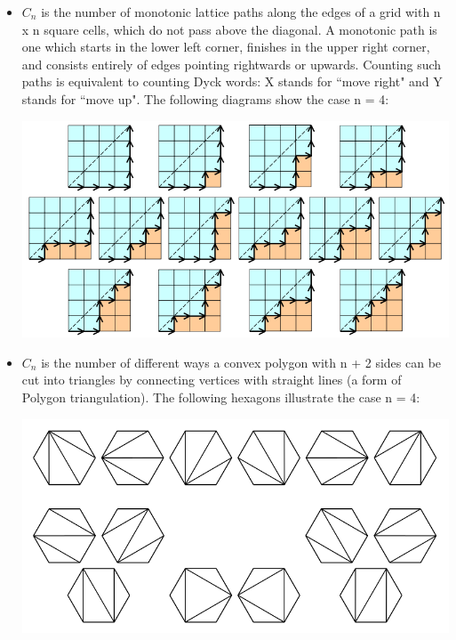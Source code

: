 \documentclass[10pt, twocolumn]{article}
\begin{document}
\begin{flushleft}
\begin{itemize}
\item $C_n$ is the number of monotonic lattice paths along the edges of a grid with n x n square cells, which do not pass above the diagonal. A monotonic path is one which starts in the lower left corner, finishes in the upper right corner, and consists entirely of edges pointing rightwards or upwards. Counting such paths is equivalent to counting Dyck words: X stands for ``move right" and Y stands for ``move up".
The following diagrams show the case n = 4:
\begin{center}
\includegraphics[scale=0.35]{Catalan_number_grid_example.png}
\end{center}


\item $C_n$ is the number of different ways a convex polygon with n + 2 sides can be cut into triangles by connecting vertices with straight lines (a form of Polygon triangulation). The following hexagons illustrate the case n = 4:
\begin{center}
\includegraphics[scale=0.35]{Catalan-Hexagons-example.png}
\end{center}



\end{itemize}
\end{flushleft}
\end{document}
